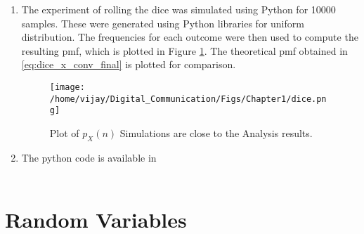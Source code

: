 \documentclass[journal,10pt,twocolumn]{IEEEtran}
\newcounter{Chapcounter}
\numberwithin{equation}{subsection}
\numberwithin{figure}{subsection}
\renewcommand\thesection{\theChapcounter.\arabic{section}}
\renewcommand\thesection{\arabic{section}}
\renewcommand\thesubsection{\thesection.\arabic{subsection}}
\begin{document}
\begin{enumerate}[label=\thesubsection.\arabic*.,ref=\thesubsection.\arabic{figure}]
\item 
The experiment of rolling the dice was simulated using Python for 10000 samples.  These were generated using Python libraries for uniform distribution. The frequencies for each outcome were then used to compute the resulting pmf, which  is plotted in Figure \ref{fig:dice}.  The theoretical pmf obtained in \eqref{eq:dice_x_conv_final} is plotted for comparison.
\begin{figure}[!ht]
\centering
\texttt{[image: /home/vijay/Digital\_Communication/Figs/Chapter1/dice.png]} 
\caption{Plot of $p_X(n)$ Simulations are close to the Analysis results. }
\label{fig:dice}
\end{figure}

\item The python code is available in\\
\
\end{enumerate}


\section{Random Variables}
\end{document}
